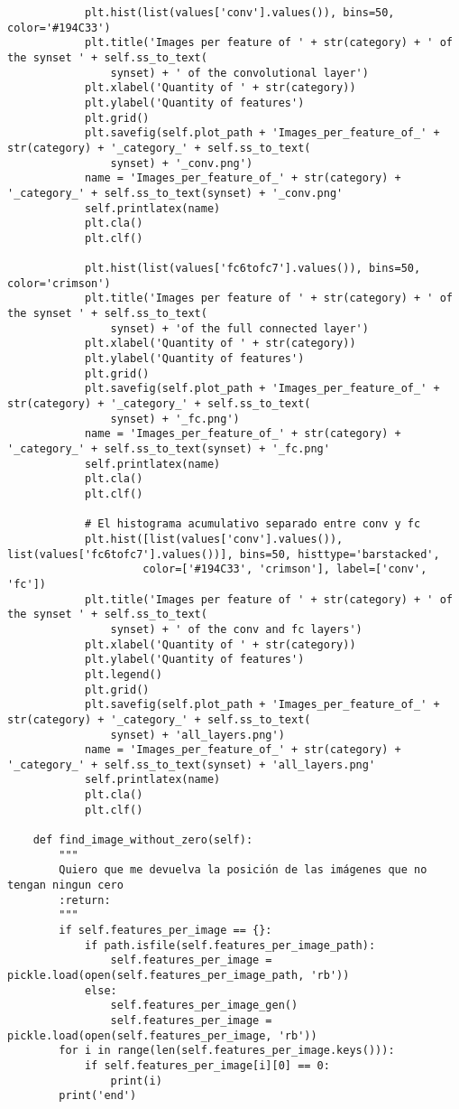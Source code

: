 \documentclass[12,twoside]{TFG-GM}
\theoremstyle{definition}
\theoremstyle{remark}
\begin{document}
\begin{verbatim}
            plt.hist(list(values['conv'].values()), bins=50, color='#194C33')
            plt.title('Images per feature of ' + str(category) + ' of the synset ' + self.ss_to_text(
                synset) + ' of the convolutional layer')
            plt.xlabel('Quantity of ' + str(category))
            plt.ylabel('Quantity of features')
            plt.grid()
            plt.savefig(self.plot_path + 'Images_per_feature_of_' + str(category) + '_category_' + self.ss_to_text(
                synset) + '_conv.png')
            name = 'Images_per_feature_of_' + str(category) + '_category_' + self.ss_to_text(synset) + '_conv.png'
            self.printlatex(name)
            plt.cla()
            plt.clf()

            plt.hist(list(values['fc6tofc7'].values()), bins=50, color='crimson')
            plt.title('Images per feature of ' + str(category) + ' of the synset ' + self.ss_to_text(
                synset) + 'of the full connected layer')
            plt.xlabel('Quantity of ' + str(category))
            plt.ylabel('Quantity of features')
            plt.grid()
            plt.savefig(self.plot_path + 'Images_per_feature_of_' + str(category) + '_category_' + self.ss_to_text(
                synset) + '_fc.png')
            name = 'Images_per_feature_of_' + str(category) + '_category_' + self.ss_to_text(synset) + '_fc.png'
            self.printlatex(name)
            plt.cla()
            plt.clf()

            # El histograma acumulativo separado entre conv y fc
            plt.hist([list(values['conv'].values()), list(values['fc6tofc7'].values())], bins=50, histtype='barstacked',
                     color=['#194C33', 'crimson'], label=['conv', 'fc'])
            plt.title('Images per feature of ' + str(category) + ' of the synset ' + self.ss_to_text(
                synset) + ' of the conv and fc layers')
            plt.xlabel('Quantity of ' + str(category))
            plt.ylabel('Quantity of features')
            plt.legend()
            plt.grid()
            plt.savefig(self.plot_path + 'Images_per_feature_of_' + str(category) + '_category_' + self.ss_to_text(
                synset) + 'all_layers.png')
            name = 'Images_per_feature_of_' + str(category) + '_category_' + self.ss_to_text(synset) + 'all_layers.png'
            self.printlatex(name)
            plt.cla()
            plt.clf()

    def find_image_without_zero(self):
        """
        Quiero que me devuelva la posición de las imágenes que no tengan ningun cero
        :return:
        """
        if self.features_per_image == {}:
            if path.isfile(self.features_per_image_path):
                self.features_per_image = pickle.load(open(self.features_per_image_path, 'rb'))
            else:
                self.features_per_image_gen()
                self.features_per_image = pickle.load(open(self.features_per_image, 'rb'))
        for i in range(len(self.features_per_image.keys())):
            if self.features_per_image[i][0] == 0:
                print(i)
        print('end')


\end{verbatim}
\end{document}
